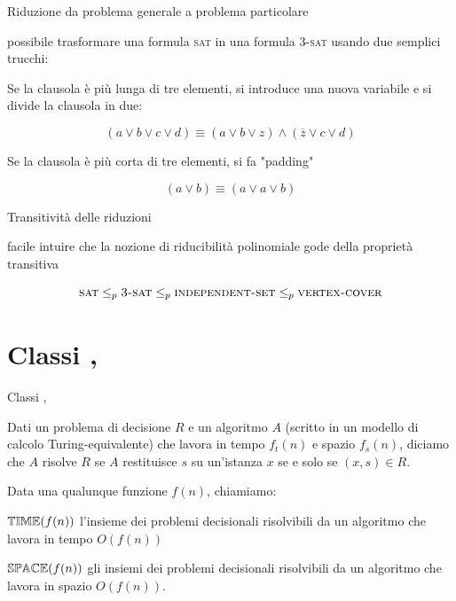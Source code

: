 \begin{frame}{Riduzione da problema generale a problema particolare}


\bigskip
{}

\pause
\smallskip
\EE possibile trasformare una formula \textsc{sat} in una formula \textsc{3-sat} usando due semplici trucchi:
\BIL
\item Se la clausola è più lunga di tre elementi, si introduce una nuova variabile e si divide la clausola in due:

\[
  (a \vee b \vee c \vee d) \equiv (a \vee b \vee z) \wedge (\overline{z} \vee c \vee d)
\]
\item Se la clausola è più corta di tre elementi, si fa "padding"

\[
  (a \vee b) \equiv (a \vee a \vee b)
\]
\EIL

\end{frame}

\begin{frame}{Transitività delle riduzioni}

\EE facile intuire che la nozione di riducibilità polinomiale gode della
proprietà transitiva

\[
  \textsc{sat} \leq_p \textsc{3-sat} \leq_p \textsc{independent-set} \leq_p \textsc{vertex-cover}
\]

\end{frame}



\section{Classi \PTIME, \PSPACE}

\begin{frame}{Classi \PTIME, \PSPACE}

\vspace{-9pt}
\begin{myboxtitle}[Algoritmo]
Dati un problema di decisione $R$ e un algoritmo $A$ (scritto in un modello di calcolo Turing-equivalente)
che lavora in tempo $f_t(n)$ e spazio $f_s(n)$, diciamo che $A$ 
risolve $R$ se $A$ restituisce $s$ su un'istanza $x$ 
se e solo se $(x,s) \in R$.
\end{myboxtitle}

\begin{myboxtitle}
Data una qualunque funzione $f(n)$, chiamiamo:
\BIL
\item \alert{$\mbox{$\mathbb{TIME}$}(f(n))$} l'insieme dei problemi decisionali
 risolvibili da un algoritmo che lavora in tempo $O(f(n))$
\item \alert{$\mbox{$\mathbb{SPACE}$}(f(n))$} gli insiemi dei problemi 
decisionali risolvibili da un algoritmo che lavora  in spazio $O(f(n))$.
\EIL
\end{myboxtitle}

\end{frame}

